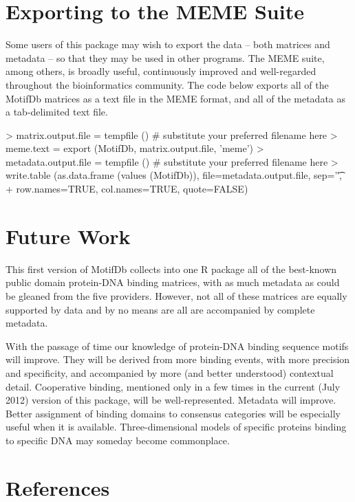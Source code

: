 \documentclass{article}
\renewenvironment{Schunk}{\vspace{\topsep}}{\vspace{\topsep}}
\begin{document}
\newpage

\section{Exporting to the MEME Suite}
Some users of this package may wish to export the data -- both matrices and metadata -- so that they may be used in
other programs.  The MEME suite, among others, is broadly useful, continuously improved and well-regarded throughout the
bioinformatics community.  The code below exports all of the MotifDb matrices as a text file in the MEME format, and all
of the metadata as a tab-delimited text file.

\begin{Schunk}
\begin{Sinput}
> matrix.output.file = tempfile ()   # substitute your preferred filename here
> meme.text = export (MotifDb, matrix.output.file, 'meme')
> metadata.output.file = tempfile () # substitute your preferred filename here
> write.table (as.data.frame (values (MotifDb)), file=metadata.output.file, sep='\t', 
+              row.names=TRUE, col.names=TRUE, quote=FALSE)
\end{Sinput}
\end{Schunk}

\section{Future Work}
This first version of MotifDb collects into one R package all of the best-known public domain protein-DNA binding matrices, with
as much metadata as could be gleaned from the five providers.  However, not all of these matrices are equally supported by data
and by no means are all are accompanied by complete metadata.

With the passage of time our knowledge of protein-DNA binding sequence motifs will improve.  They will be derived from more 
binding events, with more precision and specificity, and accompanied by more (and better understood) contextual detail.  Cooperative binding, 
mentioned only in a few times in the current (July 2012) version of this package, will be well-represented.  Metadata will improve.
Better assignment of binding domains to consensus categories will be especially useful when it is available.  Three-dimensional 
models of specific proteins binding to specific DNA may someday become commonplace.


\section{References}
\end{document}
